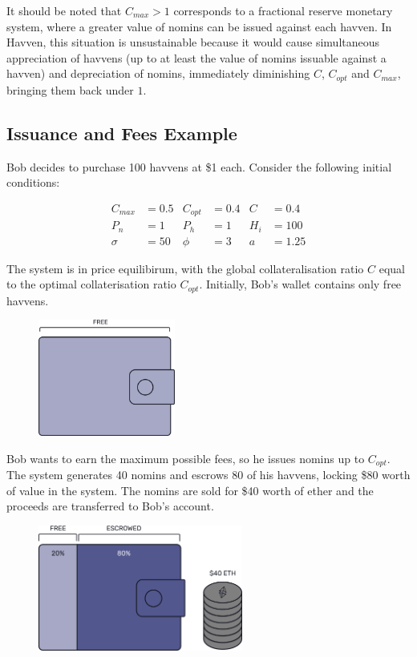 \noindent It should be noted that $C_{max} > 1$ corresponds to a fractional reserve monetary system, where a greater value of nomins can be issued against each havven. In Havven, this situation is unsustainable because it would cause simultaneous appreciation of havvens (up to at least the value of nomins issuable against a havven) and depreciation of nomins, immediately diminishing $C$, $C_{opt}$ and $C_{max}$, bringing them back under $1$.

\subsection{Issuance and Fees Example} 

\noindent Bob decides to purchase 100 havvens at \$1 each. Consider the following initial conditions:

\begin{align*}
C_{max} &= 0.5 & C_{opt} &= 0.4 & C &= 0.4 \\
P_n &= 1 & P_h &= 1 & H_i &= 100 \\
\sigma &= 50 & \phi &= 3 & a&= 1.25
\end{align*}

\noindent The system is in price equilibirum, with the global collateralisation ratio $C$ equal to the optimal collaterisation ratio $C_{opt}$. Initially,  Bob's wallet contains only free havvens.

\begin{figure}[h!]
\centering
    \includegraphics[width=0.40\textwidth]{img/wallet}
\end{figure}

\noindent Bob wants to earn the maximum possible fees, so he issues nomins up to $C_{opt}$. The system generates 40 nomins and escrows 80 of his havvens, locking \$80 worth of value in the system. The nomins are sold for \$40 worth of ether and the proceeds are transferred to Bob's account.
\begin{figure}[h!]
\centering
    \includegraphics[width=0.6\textwidth]{img/escrowed}
\end{figure}

